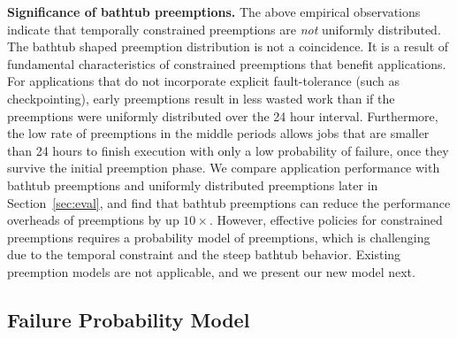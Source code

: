 \noindent \textbf{Significance of bathtub preemptions.} 
The above empirical observations indicate that temporally constrained preemptions are \emph{not} uniformly distributed. 
%
The bathtub shaped preemption distribution is not a coincidence.
It is a result of fundamental characteristics of constrained preemptions that benefit applications. 
%
For applications that do not incorporate explicit fault-tolerance (such as checkpointing), early preemptions result in less wasted work than if the preemptions were uniformly distributed over the 24 hour interval.
%
Furthermore, the low rate of preemptions in the middle periods allows jobs that are smaller than 24 hours to finish execution with only a low probability of failure, once they survive the initial preemption phase. 
%
We compare application performance with bathtub preemptions and uniformly distributed preemptions later in Section~\ref{sec:eval}, and find that bathtub preemptions can reduce the performance overheads of preemptions by up $10\times$.
%
However, effective policies for constrained preemptions  requires a probability model of preemptions, which is challenging due to the temporal constraint and the steep bathtub behavior. 
%
Existing preemption models are not applicable, and we present our new model next. 


%
%





\vspace*{\subsecspace}
\subsection{Failure Probability Model}
\label{subsec:analytical-model}

